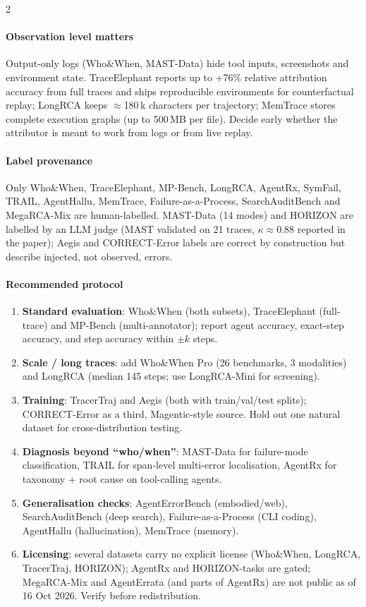 \begin{multicols}{2}
\paragraph{Observation level matters} Output-only logs (Who\&When, MAST-Data) hide tool inputs, screenshots and environment state. TraceElephant reports up to +76\% relative attribution accuracy from full traces and ships reproducible environments for counterfactual replay; LongRCA keeps $\approx$180\,k characters per trajectory; MemTrace stores complete execution graphs (up to 500\,MB per file). Decide early whether the attributor is meant to work from logs or from live replay.

\paragraph{Label provenance} Only Who\&When, TraceElephant, MP-Bench, LongRCA, AgentRx, SymFail, TRAIL, AgentHallu, MemTrace, Failure-as-a-Process, SearchAuditBench and MegaRCA-Mix are human-labelled. MAST-Data (14 modes) and HORIZON are labelled by an LLM judge (MAST validated on 21 traces, $\kappa\approx0.88$ reported in the paper); Aegis and CORRECT-Error labels are correct by construction but describe injected, not observed, errors.

\paragraph{Recommended protocol}
\begin{enumerate}[leftmargin=1.2em]
\item \textbf{Standard evaluation}: Who\&When (both subsets), TraceElephant (full-trace) and MP-Bench (multi-annotator); report agent accuracy, exact-step accuracy, and step accuracy within $\pm k$ steps.
\item \textbf{Scale / long traces}: add Who\&When Pro (26 benchmarks, 3 modalities) and LongRCA (median 145 steps; use LongRCA-Mini for screening).
\item \textbf{Training}: TracerTraj and Aegis (both with train/val/test splits); CORRECT-Error as a third, Magentic-style source. Hold out one natural dataset for cross-distribution testing.
\item \textbf{Diagnosis beyond ``who/when''}: MAST-Data for failure-mode classification, TRAIL for span-level multi-error localisation, AgentRx for taxonomy + root cause on tool-calling agents.
\item \textbf{Generalisation checks}: AgentErrorBench (embodied/web), SearchAuditBench (deep search), Failure-as-a-Process (CLI coding), AgentHallu (hallucination), MemTrace (memory).
\item \textbf{Licensing}: several datasets carry no explicit license (Who\&When, LongRCA, TracerTraj, HORIZON); AgentRx and HORIZON-tasks are gated; MegaRCA-Mix and AgentErrata (and parts of AgentRx) are not public as of 16 Oct 2026. Verify before redistribution.
\end{enumerate}
\end{multicols}
